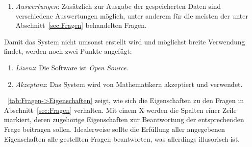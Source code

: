 \documentclass[english,ngerman,parskip=half,headsepline,footsepline]{scrreprt}
\newcounter{Enumi}
\newcommand*{\sectionname}{Abschnitt}
\begin{document}
{\begin{enumerate}
			\item \label{Eigenschaft:Auswertungen} \emph{Auswertungen}: Zusätzlich zur Ausgabe der gespeicherten Daten sind verschiedene Auswertungen möglich, unter anderem für die meisten der unter \sectionname~\vref{sec:Fragen} behandelten Fragen.

			\setcounter{Enumi}{\value{enumi}}%
		\end{enumerate}

		Damit das System nicht umsonst erstellt wird und möglichst breite Verwendung findet, werden noch zwei Punkte angefügt:

		\begin{enumerate}
			\setcounter{enumi}{\value{Enumi}}

			\item \label{Eigenschaft:Lizenz} \emph{Lizenz}: Die Software ist \emph{Open Source}.

			\item \label{Eigenschaft:Akzeptanz} \emph{Akzeptanz}: Das System wird von Mathematikern akzeptiert und verwendet.

		\end{enumerate}

		\tablename~\vref{tab:Fragen->Eigenschaften} zeigt, wie sich die Eigenschaften zu den Fragen in \sectionname~\vref{sec:Fragen} verhalten. Mit einem X werden die Spalten einer Zeile markiert, deren zugehörige Eigenschaften zur Beantwortung der entsprechenden Frage beitragen sollen. Idealerweise sollte die Erfüllung aller angegebenen Eigenschaften alle gestellten Fragen beantworten, was allerdings illusorisch ist.

}
\end{document}
